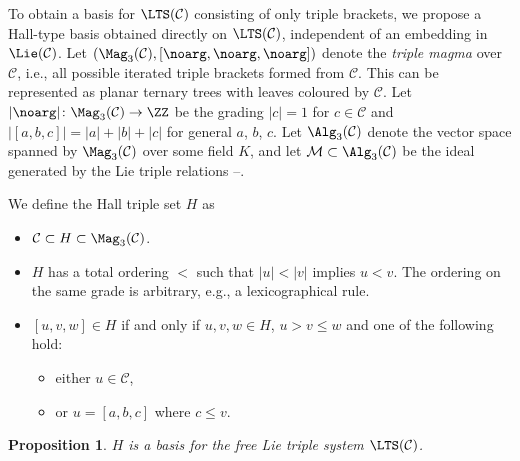 \documentclass[pdftex]{sigma}
\numberwithin{equation}{section}
\newtheorem{Proposition}[Theorem]{Proposition}
 { \theoremstyle{definition}
\newtheorem{Definition}[Theorem]{Definition}
\newtheorem{Note}[Theorem]{Note}
\newtheorem{Example}[Theorem]{Example}
\newtheorem{Remark}[Theorem]{Remark} }
\begin{document}
To obtain a basis for $\LTS(\mathcal{C})$ consisting of only triple brackets, we propose a Hall-type basis obtained directly on $\LTS(\mathcal{C})$, independent of an embedding in $\Lie(\mathcal{C})$. Let $(\Mag_3(\mathcal{C}),[\noarg,\noarg,\noarg])$ denote the \emph{triple magma} over $\mathcal{C}$, i.e., all possible iterated triple brackets formed from $\mathcal{C}$. This can be represented as planar ternary trees with leaves coloured by $\mathcal{C}$. Let $|\noarg|\colon\Mag_3(\mathcal{C})\rightarrow \ZZ$ be the grading $|c|=1$ for $c\in \mathcal{C}$ and $|[a,b,c]| = |a|+|b|+|c|$ for general $a$, $b$, $c$. Let $\Alg_3(\mathcal{C})$ denote the vector space spanned by $\Mag_3(\mathcal{C})$ over some field $K$, and let $\mathcal{M} \subset \Alg_3(\mathcal{C})$ be the ideal generated by the Lie triple relations --.

\begin{Definition}\label{def:H3}
We define the Hall triple set $H$ as
\begin{itemize}\itemsep=0pt
\item $\mathcal{C}\subset H\subset \Mag_3(\mathcal{C})$.
\item $H$ has a total ordering $<$ such that $|u|<|v|$ implies $u<v$. The ordering on the same grade is arbitrary, e.g., a lexicographical rule.
\item $[u,v,w]\in H$ if and only if $u,v,w\in H$, $u>v\leq w$ and one of the following hold:
\begin{itemize}\itemsep=0pt
 \item either $u\in \mathcal{C}$,
 \item or $u = [a,b,c]$ where $c\leq v$.
\end{itemize}
\end{itemize}
\end{Definition}

\begin{Proposition}\label{prop:LTS_Hall}
$H$ is a basis for the free Lie triple system $\LTS(\mathcal{C})$.
\end{Proposition}
\end{document}
